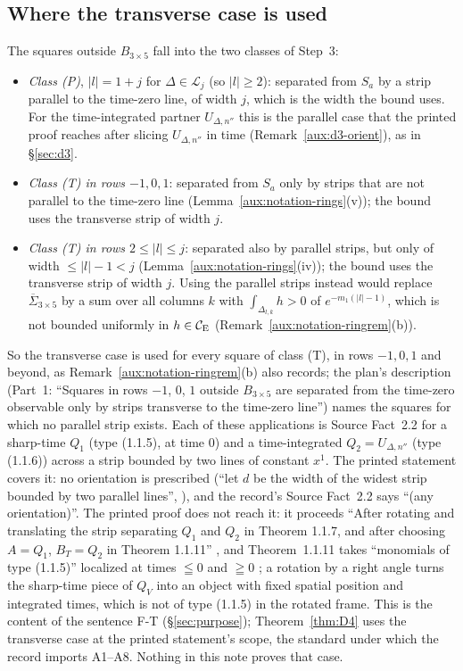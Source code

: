 \subsection{Where the transverse case is used}\label{sub:d4-transverse}

The squares outside $B_{3\times5}$ fall into the two classes of Step~3:
\begin{itemize}
\item \emph{Class (P)}, $|l|=1+j$ for $\Delta\in\mathcal L_j$ (so $|l|\ge2$): separated from $S_a$
by a strip parallel to the time-zero line, of width $j$, which is the width the bound uses.  For
the time-integrated partner $U_{\Delta,n''}$ this is the parallel case that the printed proof
reaches after slicing $U_{\Delta,n''}$ in time (Remark~\ref{aux:d3-orient}), as in \S\ref{sec:d3}.
\item \emph{Class (T) in rows $-1,0,1$}: separated from $S_a$ only by strips that are not
parallel to the time-zero line (Lemma~\ref{aux:notation-rings}(v)); the bound uses the transverse
strip of width $j$.
\item \emph{Class (T) in rows $2\le|l|\le j$}: separated also by parallel strips, but only of width
$\le|l|-1<j$ (Lemma~\ref{aux:notation-rings}(iv)); the bound uses the transverse strip of width
$j$.  Using the parallel strips instead would replace $\overline\Sigma_{3\times5}$ by a sum over
all columns $k$ with $\int_{\Delta_{l,k}}h>0$ of $e^{-m_1(|l|-1)}$, which is not bounded uniformly
in $h\in\mathcal{C}_{\mathrm E}$ (Remark~\ref{aux:notation-ringrem}(b)).
\end{itemize}
So the transverse case is used for every square of class (T), in rows $-1,0,1$ and beyond, as
Remark~\ref{aux:notation-ringrem}(b) also records; the plan's description (Part~1: ``Squares in rows
$-1$, $0$, $1$ outside $B_{3\times5}$ are separated from the time-zero observable only by strips
transverse to the time-zero line'') names the squares for which no parallel strip exists.  Each of
these applications is Source Fact~2.2 for a sharp-time $Q_1$ (type (1.1.5), at time $0$) and a
time-integrated $Q_2=U_{\Delta,n''}$ (type (1.1.6)) across a strip bounded by two lines of constant
$x^1$.  The printed statement covers it: no orientation is prescribed (``let $d$ be the width of
the widest strip bounded by two parallel lines'', \cite[p.~594]{GJS}), and the record's Source
Fact~2.2 says ``(any orientation)''.  The printed proof does not reach it: it proceeds ``After
rotating and translating the strip separating $Q_1$ and $Q_2$ in Theorem 1.1.7, and after choosing
$A=Q_1$, $B_T=Q_2$ in Theorem 1.1.11'' \cite[p.~597]{GJS}, and Theorem~1.1.11 takes ``monomials of
type (1.1.5)'' localized at times $\leqq0$ and $\geqq0$ \cite[p.~596]{GJS}; a rotation by a right
angle turns the sharp-time piece of $Q_V$ into an object with fixed spatial position and integrated
times, which is not of type (1.1.5) in the rotated frame.  This is the content of the sentence F-T
(\S\ref{sec:purpose}); Theorem~\ref{thm:D4} uses the transverse case at the printed statement's
scope, the standard under which the record imports A1--A8.  Nothing in this note proves that case.


